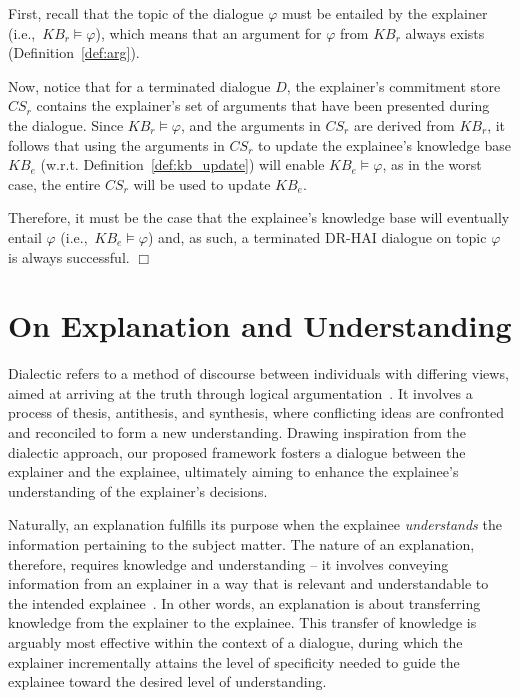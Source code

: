 \documentclass{ecai}
\newenvironment{skproof}{\noindent {\sc Proof (sketch).}}{\hfill$\Box$}
\begin{document}
\begin{skproof}
First, recall that the topic of the dialogue $\varphi$ must be entailed by the explainer (i.e.,~$KB_r \models \varphi$), which means that an argument for $\varphi$ from $KB_r$ always exists (Definition~\ref{def:arg}).

Now, notice that for a terminated dialogue $D$, the explainer's commitment store $CS_r$ contains the explainer's set of arguments that have been presented during the dialogue. Since $KB_r \models \varphi$, and the arguments in $CS_r$ are derived from $KB_r$, it follows that using the arguments in $CS_r$ to update the explainee's knowledge base $KB_e$ (w.r.t. Definition~\ref{def:kb_update}) will enable $KB_e \models \varphi$, as in the worst case, the entire $CS_r$ will be used to update $KB_e$.

Therefore, it must be the case that the explainee's knowledge base will eventually entail $\varphi$ (i.e.,~$KB_e \models \varphi$) and, as such, a terminated DR-HAI dialogue on topic $\varphi$ is always successful.   
\end{skproof}





\section{On Explanation and Understanding}
\label{understand}


Dialectic refers to a method of discourse between individuals with differing views, aimed at arriving at the truth through logical argumentation~\cite{arg_handbook}. It involves a process of thesis, antithesis, and synthesis, where conflicting ideas are confronted and reconciled to form a new understanding. Drawing inspiration from the dialectic approach, our proposed framework fosters a dialogue between the explainer and the explainee, ultimately aiming to enhance the explainee's understanding of the explainer's decisions.

Naturally, an explanation fulfills its purpose when the explainee \emph{understands} the information pertaining to the subject matter. The nature of an explanation, therefore, requires knowledge and understanding -- it involves conveying information from an explainer in a way that is relevant and understandable to the intended explainee~\cite{craik1967nature}. In other words, an explanation is about transferring knowledge from the explainer to the explainee. This transfer of knowledge is arguably most effective within the context of a dialogue, during which the explainer incrementally attains the level of specificity needed to guide the explainee toward the desired level of understanding.
\end{document}
